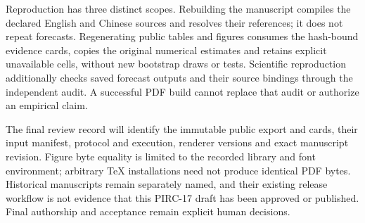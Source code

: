 Reproduction has three distinct scopes. Rebuilding the manuscript compiles
the declared English and Chinese sources and resolves their references;
it does not repeat forecasts. Regenerating public tables and figures consumes
the hash-bound evidence cards, copies the original numerical estimates and
retains explicit unavailable cells, without new bootstrap draws or tests.
Scientific reproduction additionally checks saved forecast outputs and their
source bindings through the independent audit. A successful PDF build cannot
replace that audit or authorize an empirical claim.

The final review record will identify the immutable public export and cards,
their input manifest, protocol and execution, renderer versions and exact
manuscript revision. Figure byte equality is limited to the recorded library
and font environment; arbitrary TeX installations need not produce identical
PDF bytes. Historical manuscripts remain separately named, and their existing
release workflow is not evidence that this PIRC-17 draft has been approved
or published. Final authorship and acceptance remain explicit human decisions.


